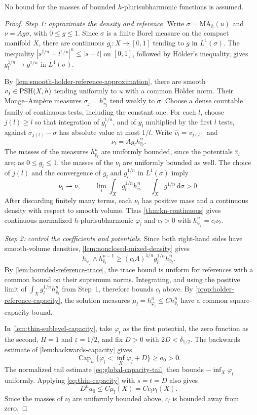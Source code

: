 No bound for the masses of bounded $h$-plurisubharmonic functions is assumed.
\begin{proof}
\emph{Step 1: approximate the density and reference.} Write $\sigma=\mathrm{MA}_h(u)$ and $\nu=A g\sigma$, with $0\leq g\leq1$. Since $\sigma$ is a finite Borel measure on the compact manifold $X$, there are continuous $g_l\colon X\to[0,1]$ tending to $g$ in $L^1(\sigma)$. The inequality $|s^{1/n}-t^{1/n}|^n\leq|s-t|$ on $[0,1]$, followed by H\"older's inequality, gives $g_l^{1/n}\to g^{1/n}$ in $L^1(\sigma)$.

By \cref{lem:smooth-holder-reference-approximation}, there are smooth $v_j\in\mathrm{PSH}(X,h)$ tending uniformly to $u$ with a common H\"older norm. Their Monge--Amp\`ere measures $\sigma_j=h_{v_j}^n$ tend weakly to $\sigma$. Choose a dense countable family of continuous tests, including the constant one. For each $l$, choose $j(l)\geq l$ so that integration of $g_l^{1/n}$, and of $g_l$ multiplied by the first $l$ tests, against $\sigma_{j(l)}-\sigma$ has absolute value at most $1/l$. Write $\widehat v_l=v_{j(l)}$ and
\[
 \nu_l=A g_l h_{\widehat v_l}^n.
\]
The masses of the measures $h_{\widehat v_l}^n$ are uniformly bounded, since the potentials $\widehat v_l$ are; as $0\leq g_l\leq1$, the masses of the $\nu_l$ are uniformly bounded as well. The choice of $j(l)$ and the convergence of $g_l$ and $g_l^{1/n}$ in $L^1(\sigma)$ imply
\[
 \nu_l\rightharpoonup\nu,\qquad
 \lim_l\int_Xg_l^{1/n}h_{\widehat v_l}^n
 =\int_Xg^{1/n}\,\mathrm d\sigma>0.
\]
After discarding finitely many terms, each $\nu_l$ has positive mass and a continuous density with respect to smooth volume. Thus \cref{thm:kn-continuous} gives continuous normalized $h$-plurisubharmonic $\varphi_l$ and $c_l>0$ with $h_{\varphi_l}^n=c_l\nu_l$.

\emph{Step 2: control the coefficients and potentials.} Since both right-hand sides have smooth-volume densities, \cref{lem:nonclosed-mixed-density} gives
\[
 h_{\varphi_l}\wedge h_{\widehat v_l}^{n-1}
 \geq(c_lA)^{1/n}g_l^{1/n}h_{\widehat v_l}^n.
\]
By \cref{lem:bounded-reference-trace}, the trace bound is uniform for references with a common bound on their supremum norms. Integrating, and using the positive limit of $\int_Xg_l^{1/n}h_{\widehat v_l}^n$ from Step~1, therefore bounds $c_l$ above. By \cref{prop:holder-reference-capacity}, the solution measures $\mu_l=h_{\varphi_l}^n\leq C h_{\widehat v_l}^n$ have a common square-capacity bound.

In \cref{lem:thin-sublevel-capacity}, take $\varphi_l$ as the first potential, the zero function as the second, $H=1$ and $\varepsilon=1/2$, and fix $D>0$ with $2D<\delta_{1/2}$. The backwards estimate of \cref{lem:backwards-capacity} gives
\[
 \operatorname{Cap}_h\{\varphi_l<\inf_X\varphi_l+D\}\geq a_0>0.
\]
The normalized tail estimate \eqref{eq:global-capacity-tail} then bounds $-\inf_X\varphi_l$ uniformly. Applying \eqref{eq:thin-capacity} with $s=t=D$ also gives
\[
 D^na_0\leq C\mu_l(X)=Cc_l\nu_l(X).
\]
Since the masses of $\nu_l$ are uniformly bounded above, $c_l$ is bounded away from zero.


\end{proof}
